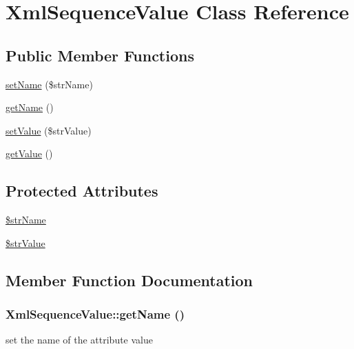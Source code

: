 \hypertarget{class_xml_sequence_value}{
\section{XmlSequenceValue Class Reference}
\label{class_xml_sequence_value}
}
\subsection*{Public Member Functions}
\begin{CompactItemize}
\item 
\hyperlink{class_xml_sequence_value_fbc33798f5add98a547e139640e700ec}{setName} (\$strName)
\item 
\hyperlink{class_xml_sequence_value_79b06938543618ff0d4f88eb93032348}{getName} ()
\item 
\hyperlink{class_xml_sequence_value_2538a3f131eec1c88ee21d963ebfb011}{setValue} (\$strValue)
\item 
\hyperlink{class_xml_sequence_value_6a7ae3d278b686a9978e02298d8a432b}{getValue} ()
\end{CompactItemize}
\subsection*{Protected Attributes}
\begin{CompactItemize}
\item 
\hyperlink{class_xml_sequence_value_6b07f7e06d0c1d63505f55f449a5b16a}{\$strName}
\item 
\hyperlink{class_xml_sequence_value_fc1506e7e5507c5204dbed497858204b}{\$strValue}
\end{CompactItemize}


\subsection{Member Function Documentation}
\hypertarget{class_xml_sequence_value_79b06938543618ff0d4f88eb93032348}{
\subsubsection[{getName}]{\setlength{\rightskip}{0pt plus 5cm}XmlSequenceValue::getName ()}}
\label{class_xml_sequence_value_79b06938543618ff0d4f88eb93032348}


set the name of the attribute value

